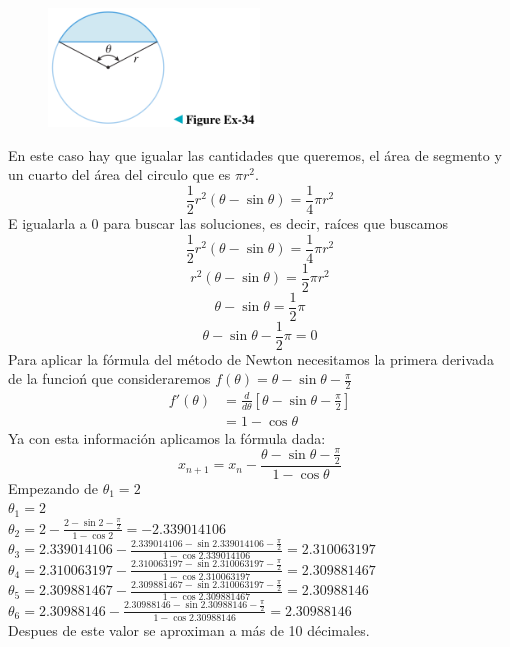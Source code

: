 \documentclass[12pt]{article}
\begin{document}
\begin{figure}[H]
\centering
\includegraphics[width=0.5\textwidth]{../img/img_Lista3/3_34.png}
\end{figure}

En este caso hay que igualar las cantidades que queremos, el área de segmento y un cuarto del área del circulo que es $\pi r^2$. 
\[
 \frac{1}{2} r^2 (\theta - \sin{\theta}) = \frac{1}{4} \pi r^2
 \]
 E igualarla a 0 para buscar las soluciones, es decir, raíces que buscamos
 \[
 \frac{1}{2} r^2 (\theta - \sin{\theta}) = \frac{1}{4} \pi r^2
 \]
 \[
 r^2 (\theta - \sin{\theta}) = \frac{1}{2} \pi r^2
 \]
  \[
 \theta - \sin{\theta} = \frac{1}{2} \pi 
  \]
  \[
 \theta - \sin{\theta} - \frac{1}{2} \pi = 0
 \]
 Para aplicar la fórmula del método de Newton necesitamos la primera derivada de la funcioń que consideraremos $f(\theta) = \theta - \sin{\theta} - \frac{\pi}{2}$
 \begin{align*}
  f'(\theta)
  &= \frac{d}{d\theta} \left[  \theta - \sin{\theta} - \frac{\pi}{2} \right]\\
  &=   1 - \cos{\theta} 
 \end{align*}
 Ya con esta información aplicamos la fórmula dada:
 \[
 x_{n+1} = x_n - \frac{ \theta - \sin{\theta} - \frac{\pi}{2}}{ 1 - \cos{\theta} }
 \]
 Empezando de $\theta_1=2$\\
 $\theta_1 = 2$ \\
 $\theta_2 =  2 - \frac{ 2 - \sin{2} - \frac{\pi}{2}}{ 1 - \cos{2} }   = -2.339014106$ \\
 $\theta_3 =  2.339014106 - \frac{ 2.339014106 - \sin{2.339014106} - \frac{\pi}{2}}{ 1 - \cos{2.339014106} } = 2.310063197$ \\
 $\theta_4 =  2.310063197 - \frac{2.310063197 - \sin{2.310063197} - \frac{\pi}{2}}{ 1 - \cos{2.310063197} } = 2.309881467$ \\
 $\theta_5 =  2.309881467 - \frac{2.309881467 - \sin{2.310063197} - \frac{\pi}{2}}{ 1 - \cos{2.309881467} } = 2.30988146$ \\
 $\theta_6 =  2.30988146 - \frac{2.30988146 - \sin{2.30988146} - \frac{\pi}{2}}{ 1 - \cos{2.30988146} } = 2.30988146$ \\

 Despues de este valor se aproximan a más de 10 décimales.
\end{document}
